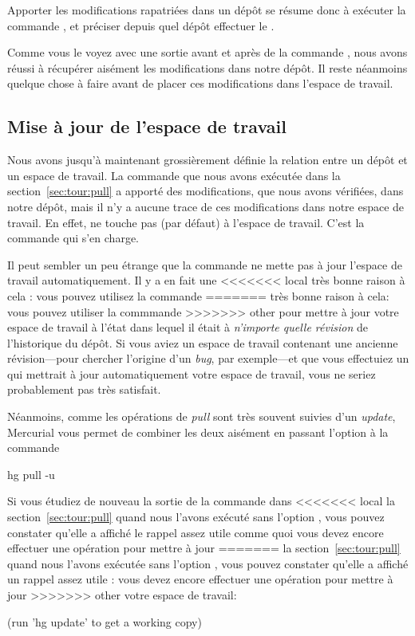 Apporter les modifications rapatriées dans un dépôt se résume donc
à exécuter la commande , et préciser depuis quel dépôt 
effectuer le .

Comme vous le voyez avec une sortie avant et après de la commande
, nous avons réussi à récupérer aisément les modifications
dans notre dépôt. Il reste néanmoins quelque chose à faire avant de
placer ces modifications dans l'espace de travail.

\subsection{Mise à jour de l'espace de travail}

Nous avons jusqu'à maintenant grossièrement définie la relation 
entre un dépôt et un espace de travail. La commande  que
nous avons exécutée dans la section~\ref{sec:tour:pull} a apporté
des modifications, que nous avons vérifiées, dans notre dépôt, mais
il n'y a aucune trace de ces modifications dans notre espace de travail.
En effet,  ne touche pas (par défaut) à l'espace de 
travail. C'est la commande  qui s'en charge.

Il peut sembler un peu étrange que la commande  ne mette
pas à jour l'espace de travail automatiquement. Il y a en fait une
<<<<<<< local
très bonne raison à cela : vous pouvez utilisez la commande 
=======
très bonne raison à cela: vous pouvez utiliser la commmande 
>>>>>>> other
 pour mettre à jour votre espace de travail à l'état
dans lequel il était à \emph{n'importe quelle révision} de l'historique
du dépôt. Si vous aviez un espace de travail contenant une ancienne
révision---pour chercher l'origine d'un \textit{bug}, par exemple---et
que vous effectuiez un  qui mettrait à jour automatiquement
votre espace de travail, vous ne seriez probablement pas très satisfait.

Néanmoins, comme les opérations de \textit{pull} sont très souvent
suivies d'un \textit{update}, Mercurial vous permet de combiner les
deux aisément en passant l'option  à la commande
\begin{codesample2}
  hg pull -u
\end{codesample2}

Si vous étudiez de nouveau la sortie de la commande  dans
<<<<<<< local
la section~\ref{sec:tour:pull} quand nous l'avons exécuté sans l'option
, vous pouvez constater qu'elle a affiché le rappel assez
utile comme quoi vous devez encore effectuer une opération pour mettre à jour
=======
la section~\ref{sec:tour:pull} quand nous l'avons exécutée sans l'option
, vous pouvez constater qu'elle a affiché un rappel assez
utile : vous devez encore effectuer une opération pour mettre à jour
>>>>>>> other
votre espace de travail:
\begin{codesample2}
  (run 'hg update' to get a working copy)
\end{codesample2}

